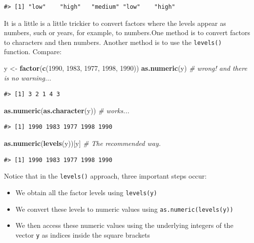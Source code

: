 \documentclass[
]{book}
\newenvironment{Shaded}{\begin{snugshade}}{\end{snugshade}}
\newcommand{\CommentTok}[1]{\textcolor[rgb]{0.56,0.35,0.01}{\textit{#1}}}
\newcommand{\DecValTok}[1]{\textcolor[rgb]{0.00,0.00,0.81}{#1}}
\newcommand{\FunctionTok}[1]{\textcolor[rgb]{0.13,0.29,0.53}{\textbf{#1}}}
\newcommand{\NormalTok}[1]{#1}
\newcommand{\OtherTok}[1]{\textcolor[rgb]{0.56,0.35,0.01}{#1}}
\providecommand{\tightlist}{%
  \setlength{\itemsep}{0pt}\setlength{\parskip}{0pt}}
\begin{document}
\begin{verbatim}
#> [1] "low"    "high"   "medium" "low"    "high"
\end{verbatim}

It is a little is a little trickier to convert factors where the levels appear as numbers, such or years, for example, to numbers.One method is to
convert factors to characters and then numbers. Another method is to use the \texttt{levels()} function. Compare:

\begin{Shaded}
\begin{Highlighting}[]
\NormalTok{y }\OtherTok{\textless{}{-}} \FunctionTok{factor}\NormalTok{(}\FunctionTok{c}\NormalTok{(}\DecValTok{1990}\NormalTok{, }\DecValTok{1983}\NormalTok{, }\DecValTok{1977}\NormalTok{, }\DecValTok{1998}\NormalTok{, }\DecValTok{1990}\NormalTok{))}
\FunctionTok{as.numeric}\NormalTok{(y)               }\CommentTok{\# wrong! and there is no warning...}
\end{Highlighting}
\end{Shaded}

\begin{verbatim}
#> [1] 3 2 1 4 3
\end{verbatim}

\begin{Shaded}
\begin{Highlighting}[]
\FunctionTok{as.numeric}\NormalTok{(}\FunctionTok{as.character}\NormalTok{(y)) }\CommentTok{\# works...}
\end{Highlighting}
\end{Shaded}

\begin{verbatim}
#> [1] 1990 1983 1977 1998 1990
\end{verbatim}

\begin{Shaded}
\begin{Highlighting}[]
\FunctionTok{as.numeric}\NormalTok{(}\FunctionTok{levels}\NormalTok{(y))[y]    }\CommentTok{\# The recommended way.}
\end{Highlighting}
\end{Shaded}

\begin{verbatim}
#> [1] 1990 1983 1977 1998 1990
\end{verbatim}

Notice that in the \texttt{levels()} approach, three important steps occur:

\begin{itemize}
\tightlist
\item
  We obtain all the factor levels using \texttt{levels(y)}
\item
  We convert these levels to numeric values using \texttt{as.numeric(levels(y))}
\item
  We then access these numeric values using the underlying integers of the vector \texttt{y} as indices inside the square brackets
\end{itemize}
\end{document}
